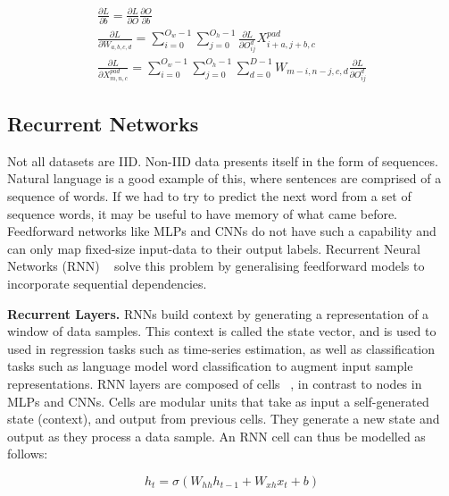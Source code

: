 \begin{subequations}
	\begin{gather}
		\frac{\partial L} {\partial b} = \frac{\partial L} {\partial O}\frac{\partial O} {\partial b} \\
		\frac{\partial L} {\partial W_{a,b,c,d}} = \sum_{i=0}^{O_w - 1}\sum_{j=0}^{O_h - 1}\frac{\partial L} {\partial O_{ij}^{d}}X_{i+a,j+b,c}^{pad} \\
		\frac{\partial L} {\partial X_{m,n,c}^{pad}} = \sum_{i=0}^{O_w - 1}\sum_{j=0}^{O_h - 1}\sum_{d=0}^{D - 1}W_{m-i,n-j,c,d}\frac{\partial L} {\partial O_{ij}^{d}}
	\end{gather}
\end{subequations}


\subsection{Recurrent Networks}

Not all datasets are IID. Non-IID data presents itself in the form of sequences. Natural language is a good example of this, where sentences are comprised of a sequence of words. If we had to try to predict the next word from a set of sequence words, it may be useful to have memory of what came before. Feedforward networks like MLPs and CNNs do not have such a capability and can only map fixed-size input-data to their output labels. Recurrent Neural Networks (RNN) ~\citep{werbos1988generalization} solve this problem by generalising feedforward models to incorporate sequential dependencies. \bigskip

\textbf{Recurrent Layers.} RNNs build context by generating a representation of a window of data samples. This context is called the state vector, and is used to used in regression tasks such as time-series estimation, as well as classification tasks such as language model word classification to augment input sample representations. RNN layers are composed of cells ~\citep{DLIndaba2018}, in contrast to nodes in MLPs and CNNs. Cells are modular units that take as input a self-generated state (context), and output from previous cells. They generate a new state and output as they process a data sample. An RNN cell can thus be modelled as follows: 

\begin{equation}
	h_t = \sigma(W_{hh}h_{t-1} + W_{xh}x_t + b)
\end{equation}

